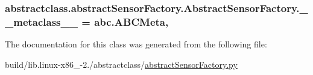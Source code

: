 \subsubsection[{\+\_\+\+\_\+metaclass\+\_\+\+\_\+}]{\setlength{\rightskip}{0pt plus 5cm}abstractclass.\+abstract\+Sensor\+Factory.\+Abstract\+Sensor\+Factory.\+\_\+\+\_\+metaclass\+\_\+\+\_\+ = abc.\+A\+B\+C\+Meta\hspace{0.3cm}{\ttfamily [static]}, {\ttfamily [private]}}\label{classabstractclass_1_1abstractSensorFactory_1_1AbstractSensorFactory_afa23d4cdf44573e36f08d503b28d2f31}


The documentation for this class was generated from the following file\+:\begin{DoxyCompactItemize}
\item 
build/lib.\+linux-\/x86\+\_-\/2./abstractclass/\hyperlink{build_2lib_8linux-x86__64-2_87_2abstractclass_2abstractSensorFactory_8py}{abstract\+Sensor\+Factory.\+py}\end{DoxyCompactItemize}
